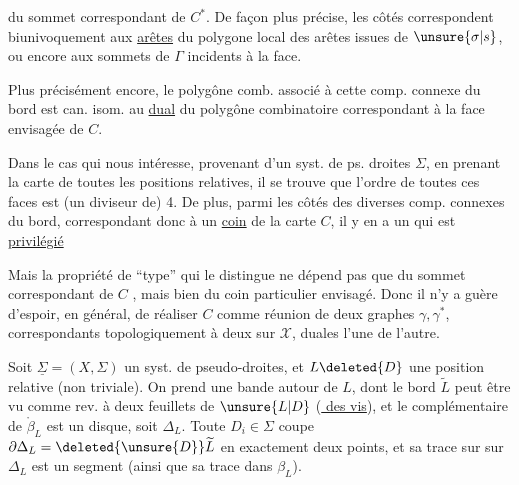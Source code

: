 
du sommet correspondant de $C^*$. De façon plus précise, les côtés correspondent biunivoquement aux \uline{arêtes} du polygone local des arêtes  issues de $\unsure{\sigma|s}$, ou encore aux sommets de $\Gamma$ incidents à la face.

Plus précisément encore, le polygône comb. associé à cette comp. connexe du bord est can. isom. au \uline{dual} du polygône combinatoire correspondant à la face envisagée de $C$. \unsure{(}

Dans le cas qui nous intéresse, provenant d'un syst. de ps. droites $\Sigma$, en prenant la carte  de toutes les positions relatives, il se trouve que l'ordre de toutes ces faces est (un diviseur de) 4. De plus, parmi les  côtés des diverses comp. connexes du bord, correspondant donc à un \uline{coin} de la carte $C$, il y en a un qui est \uline{privilégié}

Mais la propriété de ``type'' qui le distingue ne dépend pas  que du sommet correspondant de $C$ , mais bien du coin  particulier envisagé. Donc il n'y a  guère d'espoir, en général, de réaliser  $C$ comme réunion de deux  graphes $\gamma,\gamma^*$, correspondants topologiquement à deux    sur $\mathcal X$, duales l'une de l'autre.

Soit $\underline\Sigma=(X,\Sigma)$ un syst. de pseudo-droites, et $L\deleted{D}$ une position relative (non triviale). On prend une  bande  autour de $L$, dont le bord $\widetilde L$ peut être vu comme rev. à deux feuillets de $\unsure{L|D}$ (\uline{ des vis}), et le complémentaire de $\mathring\beta_L$ est un disque,  soit $\Delta_L$. Toute $D_i\in\Sigma$ coupe $\partial\Delta_L=\deleted{\unsure{D}}\widetilde L$  en exactement deux points, et sa trace sur  sur $\Delta_L$ est un segment (ainsi que sa trace dans $\beta_L$).

